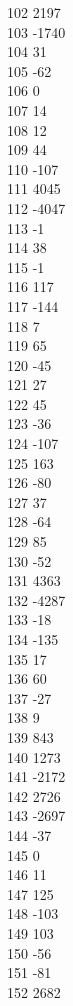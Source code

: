 { 102	2197 \\
 103	-1740 \\
 104	31 \\
 105	-62 \\
 106	0 \\
 107	14 \\
 108	12 \\
 109	44 \\
 110	-107 \\
 111	4045 \\
 112	-4047 \\
 113	-1 \\
 114	38 \\
 115	-1 \\
 116	117 \\
 117	-144 \\
 118	7 \\
 119	65 \\
 120	-45 \\
 121	27 \\
 122	45 \\
 123	-36 \\
 124	-107 \\
 125	163 \\
 126	-80 \\
 127	37 \\
 128	-64 \\
 129	85 \\
 130	-52 \\
 131	4363 \\
 132	-4287 \\
 133	-18 \\
 134	-135 \\
 135	17 \\
 136	60 \\
 137	-27 \\
 138	9 \\
 139	843 \\
 140	1273 \\
 141	-2172 \\
 142	2726 \\
 143	-2697 \\
 144	-37 \\
 145	0 \\
 146	11 \\
 147	125 \\
 148	-103 \\
 149	103 \\
 150	-56 \\
 151	-81 \\
 152	2682 \\
}
